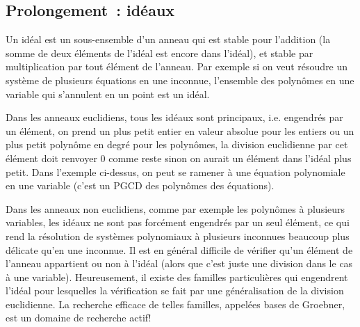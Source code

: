 \documentclass[a4paper,11pt]{book}
\begin{document}
\begin{giacjshere}
\subsection{Prolongement~: id\'eaux}
Un id\'eal est un sous-ensemble d'un anneau qui est stable pour
l'addition (la somme de deux \'el\'ements de l'id\'eal est encore
dans l'id\'eal), et stable par multiplication par tout \'el\'ement
de l'anneau. Par exemple si on veut r\'esoudre un
syst\`eme de plusieurs \'equations en une inconnue,
l'ensemble des polyn\^omes
en une variable qui s'annulent en un point est un id\'eal.

Dans les anneaux euclidiens, tous les id\'eaux
sont principaux, i.e. engendr\'es par un \'el\'ement, on prend
un plus petit entier en valeur absolue pour les entiers ou un plus
petit polyn\^ome en degr\'e pour les polyn\^omes, la division
euclidienne par cet \'el\'ement doit renvoyer 0 comme reste sinon on aurait
un \'el\'ement dans l'id\'eal plus petit. Dans l'exemple ci-dessus,
on peut se ramener \`a une \'equation polynomiale en une variable
(c'est un PGCD des polyn\^omes des \'equations).

Dans les anneaux non euclidiens, comme par exemple
les polyn\^omes \`a plusieurs
variables, les id\'eaux ne sont pas forc\'ement engendr\'es
par un seul \'el\'ement, ce qui rend la r\'esolution
de syst\`emes polynomiaux \`a plusieurs inconnues
beaucoup plus d\'elicate qu'en une inconnue. 
Il est en g\'en\'eral difficile de v\'erifier
qu'un \'el\'ement de l'anneau appartient ou non \`a l'id\'eal
(alors que c'est juste une division dans le cas \`a une variable).
Heureusement, il existe des familles particuli\`eres qui engendrent
l'id\'eal pour lesquelles la v\'erification se fait par une
g\'en\'eralisation de la division euclidienne.
La recherche efficace de telles familles, appel\'ees bases de Groebner,
est un domaine de recherche actif!


\end{giacjshere}
\end{document}
